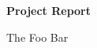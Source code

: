 \documentclass{article}
\title{\flushleft\assignment}
\author{}
\date{}
\newcommand{\assignment}[1][]{Just an Assignment}
\newcommand{\assignmentTitle}[1][\assignment]{Project Report}
\newcommand{\assignmentSubtitle}[1][]{The Foo Bar}
\begin{document}

\rule{0em}{12ex}

\noindent\textbf{\Huge\assignmentTitle{}}

\rule{0em}{1ex}

\noindent\large\assignmentSubtitle{}

\rule{0em}{5ex}

\normalsize
\begin{multicols*}{2}
\blindtext[7]

\end{multicols*}
\end{document}
